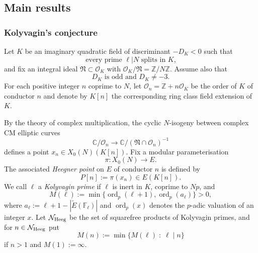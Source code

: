 \documentclass[10pt,reqno]{amsart}
\numberwithin{equation}{section}
\theoremstyle{plain}
\theoremstyle{definition}
\theoremstyle{definition}
\theoremstyle{plain}
\theoremstyle{plain}
\theoremstyle{plain}
\theoremstyle{plain}
\theoremstyle{plain}
\theoremstyle{plain}
\DeclareMathOperator{\ord}{ord}
\newcommand{\Z}{\mathbb{Z}}
\begin{document}
\subsection{Main results}

\subsubsection*{Kolyvagin's conjecture} 

Let $K$ be an imaginary quadratic field of discriminant $-D_K<0$ such that
\begin{equation}\label{eq:intro-Heeg}
\textrm{every prime $\ell\vert N$ splits in $K$,}\tag{Heeg}
\end{equation} 
and fix an integral ideal $\mathfrak{N}\subset\mathcal{O}_K$ with $\mathcal{O}_K/\mathfrak{N}=\Z/N\Z$. Assume also that
\begin{equation}\label{eq:intro-disc}
\textrm{$D_K$ is odd and $D_K\neq -3$.}\tag{disc}
\end{equation}
For each positive integer $n$ coprime to $N$, let $\mathcal{O}_n=\Z+n\mathcal{O}_K$ be the order of $K$ of conductor $n$ and denote by  $K[n]$ the corresponding ring class field extension of $K$.

By the theory of complex multiplication, the cyclic $N$-isogeny between complex CM elliptic curves
\[
\mathbb{C}/\mathcal{O}_n\rightarrow\mathbb{C}/(\mathfrak{N}\cap\mathcal{O}_n)^{-1}
\]
defines a point $x_n\in X_0(N)(K[n])$. Fix a modular parameterisation 
\begin{equation}\label{par}
\pi:X_0(N)\rightarrow E.
\end{equation}
The associated \emph{Heegner point} on $E$ of conductor $n$ is defined by   
\begin{equation}\label{eq:heegnerpoint}
P[n]:=\pi(x_n)\in E(K[n]).
\end{equation}
We call $\ell$ a \emph{Kolyvagin prime} if $\ell$ is inert in $K$, coprime to $Np$, and 
$$
M(\ell):=\min \{\ord_p(\ell+1), \ord_p(a_\ell)\}>0,
$$
 where $a_\ell:=\ell+1-|\tilde{E}(\mathbb{F}_\ell)|$ and $\ord_p(x)$ denotes the $p$-adic valuation of an integer $x$. Let $\mathcal{N}_{\rm Heeg}$ be the set of squarefree products of Kolyvagin primes, and for $n\in \mathcal{N}_{\rm Heeg}$ put 
$$
 M(n):=\min \{M(\ell)\;\colon\;\ell\mid n\}
$$
if $n>1$ and $M(1):=\infty$. 
\end{document}
